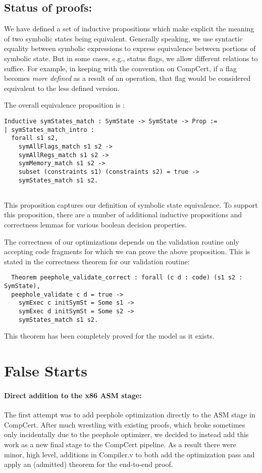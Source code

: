 \documentclass{article}
\begin{document}
\subsection{Status of proofs: }
We have defined a set of inductive propositions which make explicit
the meaning of two symbolic states being equivalent. Generally
speaking, we use syntactic equality between symbolic expressions to
express equivalence between portions of symbolic state. But
in some cases, e.g., status flags, we allow different relations to
suffice. For example, in keeping with the convention on CompCert, if a
flag becomes {\it more defined} as a result of an operation, that flag
would be considered equivalent to the less defined version. 

The overall equivalence proposition is :

\begin{verbatim}
Inductive symStates_match : SymState -> SymState -> Prop :=
| symStates_match_intro : 
  forall s1 s2, 
    symAllFlags_match s1 s2 ->
    symAllRegs_match s1 s2 ->
    symMemory_match s1 s2 ->
    subset (constraints s1) (constraints s2) = true ->
    symStates_match s1 s2. 
  
\end{verbatim}

This proposition captures our definition of symbolic state
equivalence. To support this proposition, there are a number of
additional inductive propositions and correctness lemmas for various
boolean decision properties. 

The correctness of our optimizations depends on the validation routine
only accepting code fragments for which we can prove the above
proposition. This is stated in  the correctness theorem for our
validation routine:

\begin{verbatim}
  Theorem peephole_validate_correct : forall (c d : code) (s1 s2 : SymState),
  peephole_validate c d = true -> 
    symExec c initSymSt = Some s1 -> 
    symExec d initSymSt = Some s2 ->
    symStates_match s1 s2.
\end{verbatim}

This theorem has been completely proved for the model as it
exists.

\section{False Starts}
\paragraph{Direct addition to the x86 ASM stage: }
The first attempt was to add peephole optimization directly to the ASM
stage in CompCert.  After much wrestling with existing proofs, which
broke sometimes only incidentally due to the peephole optimizer, we
decided to instead add this work as a new final stage to the CompCert
pipeline.  As a result there were minor, high level, additions in
Compiler.v to both add the optimization pass and apply an (admitted)
theorem for the end-to-end proof.
\end{document}
